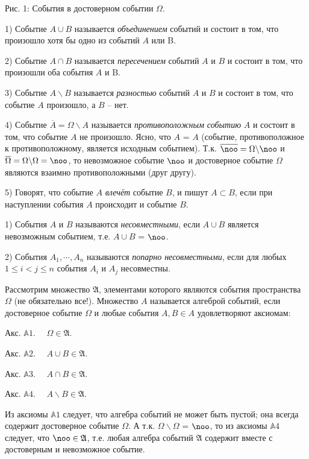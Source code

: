 Рис. 1: События в достоверном событии $\Omega$.
\begin{definition}
1) Событие $A \cup B$ называется \textit{объединением} событий и состоит в том, что произошло хотя бы одно из событий $A$ или B.

2) Событие $A\cap B$ называется \textit{пересечением} событий $A$ и $B$ и состоит в
том, что произошли оба события $A$ и B.

3) Событие $A\backslash B$ называется \textit{разностью} событий $A$ и $B$ и состоит в том,
что событие $A$ произошло, а $B$ -- нет.

4) Событие $\overline{A}=\Omega\backslash A$ называется \textit{противоположным событию} $A$ и состоит в том, что событие $A$ не произошло. Ясно, что $A$ = $A$ (событие, противоположное к противоположному, является исходным событием).
Т.к. $\overline{\noo}=\Omega\backslash\noo$ и $\overline{\Omega}=\Omega\backslash\Omega=\noo$, то невозможное событие $\noo$ и
достоверное событие $\Omega$ являются взаимно противоположными (друг другу).

5) Говорят, что событие $A$ \textit{влечёт} событие $B$, и пишут $A\subset B$, если при
наступлении события $A$ происходит и событие $B$.
\end{definition}


\begin{definition}
1) События $A$ и $B$ называются \textit{несовместными}, если
$A\cup B$ является невозможным событием, т.е. $A\cup B$ = $\noo$.

2) События $A_1,\cdots,A_n$ называются \textit{попарно несовместными}, если для любых $1\leq i<j\leq n$ события $A_i$ и $A_j$ несовместны.
\end{definition}

\begin{definition}
Рассмотрим множество $\mathfrak{A}$, элементами которого являются события пространства $\Omega$ (не обязательно все!). Множество $A$ называется
алгеброй событий, если достоверное событие $\Omega$ и любые события $A, B \in A$
удовлетворяют аксиомам:

Акс. $\mathbb{A}1$.$\quad$ $\Omega\in\mathfrak{A}$.

Акс. $\mathbb{A}2$.$\quad$ $A\cup B\in\mathfrak{A}$.

Акс. $\mathbb{A}3$.$\quad$ $A\cap B\in\mathfrak{A}$.

Акс. $\mathbb{A}4$.$\quad$ $A\backslash B\in\mathfrak{A}$.


Из аксиомы $\mathbb{A}1$ следует, что алгебра событий не может быть пустой; она
всегда содержит достоверное событие $\Omega$. А т.к. $\Omega \backslash \Omega$ = $\noo$, то из аксиомы $\mathbb{A}4$ следует, что $\noo\in\mathfrak{A}$, т.е. любая алгебра событий $\mathfrak{A}$ содержит вместе с достоверным и невозможное событие.
\end{definition}

